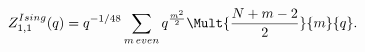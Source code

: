 \begin{equation}
Z_{1,1}^{Ising}(q) = q^{-1/48}
\sum_{m\,even} q^{\frac{m^2}{2}} \Mult{\frac{N+m-2}{2}}{m}{q}.
\end{equation}

